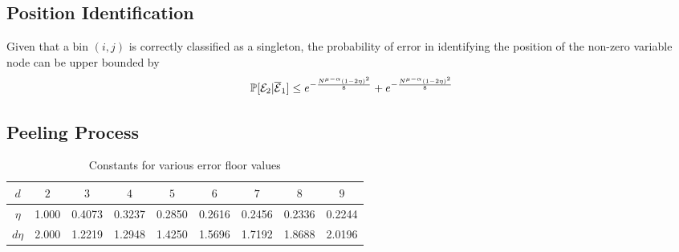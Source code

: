 \subsection{\bf Position Identification}
\begin{lemma}
Given that a bin $(i,j)$ is correctly classified as a singleton, the probability of error in identifying the position of the non-zero variable node can be upper bounded by
\begin{align*}
\mathbb{P}[\mathcal{E}_2|\overline{\mathcal{E}}_1]\leq e^{-\frac{N^{\mu-\alpha}(1-2\eta)^2}{8}}+e^{-\frac{N^{\mu-\alpha}(1-2\eta)^2}{8}}
\end{align*}
\end{lemma}

\subsection{\bf Peeling Process}
\begin{table}[t]
\centering
\begin{tabular}{| c | c | c | c | c | c | c | c | c | }
\hline
$d$ & $2$& $3$ & $4$ & $5$ & $6$ & $7$ & $8$ & $9$ \\ \hline
$\eta$ & 1.000 & 0.4073 & 0.3237 & 0.2850 & 0.2616 & 0.2456 & 0.2336 & 0.2244 \\ \hline
 $d\eta$ & 2.000 & 1.2219 & 1.2948 & 1.4250 & 1.5696 & 1.7192 & 1.8688 & 2.0196 \\ \hline
\end{tabular}
\vspace{1ex}
\caption{Constants for various error floor values}
\label{Table:EtaValues}
\end{table}

